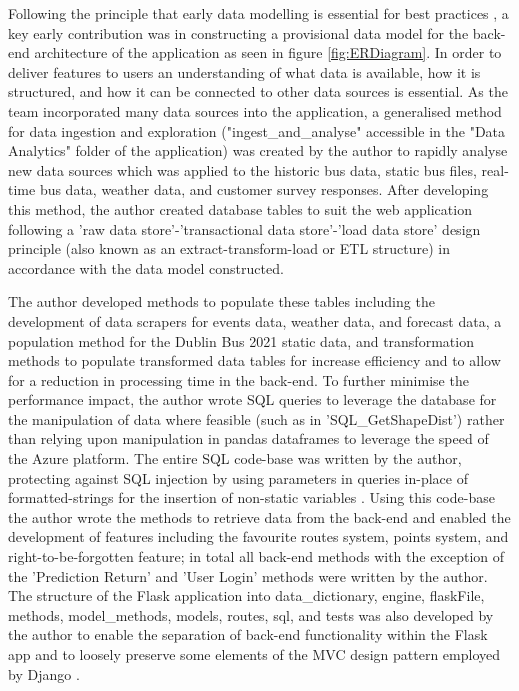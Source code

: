 \documentclass[]{UCD_CS_47360_Report}
\begin{document}
Following the principle that early data modelling is essential for best practices \cite{DataModel}, a key early contribution was in constructing a provisional data model for the back-end architecture of the application as seen in figure \ref{fig:ERDiagram}. In order to deliver features to users an understanding of what data is available, how it is structured, and how it can be connected to other data sources is essential. As the team incorporated many data sources into the application, a generalised method for data ingestion and exploration ("ingest\_and\_analyse" accessible in the "Data Analytics" folder of the application) was created by the author to rapidly analyse new data sources which was applied to the historic bus data, static bus files, real-time bus data, weather data, and customer survey responses. After developing this method, the author created database tables to suit the web application following a 'raw data store'-'transactional data store'-'load data store' design principle (also known as an extract-transform-load or ETL structure) \cite{ETL} in accordance with the data model constructed. 

The author developed methods to populate these tables including the development of data scrapers for events data, weather data, and forecast data, a population method for the Dublin Bus 2021 static data, and transformation methods to populate transformed data tables for increase efficiency and to allow for a reduction in processing time in the back-end. To further minimise the performance impact, the author wrote SQL queries to leverage the database for the manipulation of data where feasible (such as in 'SQL\_GetShapeDist') rather than relying upon manipulation in pandas dataframes to leverage the speed of the Azure platform. The entire SQL code-base was written by the author, protecting against SQL injection by using parameters in queries in-place of formatted-strings for the insertion of non-static variables \cite{Injection}. Using this code-base the author wrote the methods to retrieve data from the back-end and enabled the development of features including the favourite routes system, points system, and right-to-be-forgotten feature; in total all back-end methods with the exception of the 'Prediction Return' and 'User Login' methods were written by the author. The structure of the Flask application into data\_dictionary, engine, flaskFile, methods, model\_methods, models, routes, sql, and tests was also developed by the author to enable the separation of back-end functionality within the Flask app and to loosely preserve some elements of the MVC design pattern employed by Django \cite{WhyDjango}.
\end{document}
